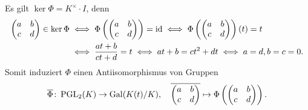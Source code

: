 \documentclass[a4paper,10pt,numbers=noenddot]{scrartcl}
\begin{document}
Es gilt $\ker \Phi = K^\times \cdot I$, denn
\begin{align*}
        \begin{pmatrix}
          a & b
          \\
          c & d
        \end{pmatrix}
        \in
        \ker \Phi
  &\iff
        \Phi
        \left(
          \begin{pmatrix}
            a & b
            \\
            c & d
          \end{pmatrix}
        \right)
        =
        \operatorname{id}
  \iff
        \Phi
        \left(
          \begin{pmatrix}
            a & b
            \\
            c & d
          \end{pmatrix}
        \right)
        (t)
        =
        t
  \\
  &\iff
        \frac{at+b}{ct+d} = t
  \iff
        at + b = ct^2 + dt
  \iff
        a = d, b = c = 0.
\end{align*}
Somit induziert $\Phi$ einen Antiisomorphismus von Gruppen
\[
  \overline{\Phi}
  \colon
  \operatorname{PGL}_2(K) \to \operatorname{Gal}(K(t)/K),
  \quad
  \overline{
  \begin{pmatrix}
    a & b
    \\
    c & d
  \end{pmatrix}
  }
  \mapsto
  \Phi
  \left(
    \begin{pmatrix}
      a & b
      \\
      c & d
    \end{pmatrix}
  \right).
\]
\end{document}
